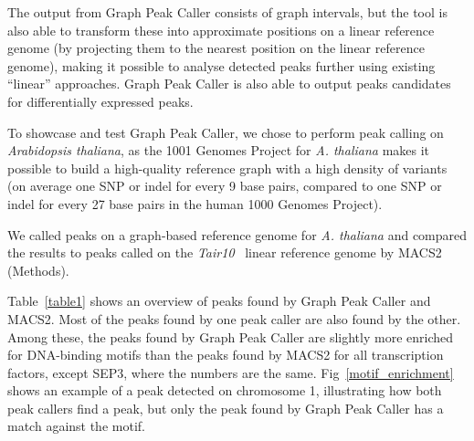 \documentclass[10pt,letterpaper]{article}
\begin{document}
The output from Graph Peak Caller consists of graph intervals, but the tool is also able to transform these into approximate positions on a linear reference genome (by projecting them to the nearest position on the linear reference genome), making it possible to analyse detected peaks further using existing “linear” approaches.
Graph Peak Caller is also able to output peaks candidates for differentially expressed peaks.

To showcase and test Graph Peak Caller, we chose to perform peak calling on \emph{Arabidopsis thaliana}, as the 1001 Genomes Project for \emph{A. thaliana} makes it possible to build a high-quality reference graph with a high density of variants (on average one SNP or indel for every 9 base pairs, compared to one SNP or indel for every 27 base pairs in the human 1000 Genomes Project). 

We called peaks on a graph-based reference genome for \emph{A. thaliana} and compared the results to peaks called on the \emph{Tair10}~\cite{tair} linear reference genome by MACS2 (Methods).



Table~\ref{table1} shows an overview of peaks found by Graph Peak Caller and MACS2.
Most of the peaks found by one peak caller are also found by the other.
Among these, the peaks found by Graph Peak Caller are slightly more enriched for DNA-binding motifs than the peaks found by MACS2 for all transcription factors, except SEP3, where the numbers are the same.
Fig~\ref{motif_enrichment} shows an example of a peak detected on chromosome 1, illustrating how both peak callers find a peak, but only the peak found by Graph Peak Caller has a match against the motif.
\end{document}
